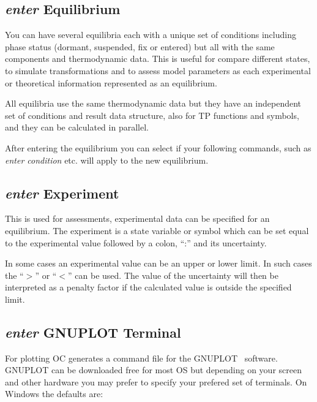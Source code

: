 \documentclass[11pt]{article}
\begin{document}
\hypertarget{Enter equilibrium}{}
\subsection{{\em enter} Equilibrium}

You can have several equilibria each with a unique set of conditions
including phase status (dormant, suspended, fix or entered) but all
with the same components and thermodynamic data.  This is useful for
compare different states, to simulate transformations and to assess
model parameters as each experimental or theoretical information
represented as an equilibrium.

All equilibria use the same thermodynamic data but they have an
independent set of conditions and result data structure, also for TP
functions and symbols, and they can be calculated in parallel.

After entering the equilibrium you can select if your following
commands, such as {\em enter condition} etc. will apply to the new
equilibrium.

\hypertarget{Enter experiment}{}
\subsection{{\em enter} Experiment}\label{sc:enterexp}

This is used for assessments, experimental data can be specified for
an equilibrium.  The experiment is a state variable or symbol which
can be set equal to the experimental value followed by a colon, ``:''
and its uncertainty.

In some cases an experimental value can be an upper or lower limit.
In such cases the ``$>$'' or ``$<$'' can be used.  The value of the
uncertainty will then be interpreted as a penalty factor if the
calculated value is outside the specified limit.

\hypertarget{Enter GNUTERM}{}
\subsection{{\em enter} GNUPLOT Terminal}\label{sc:gnuterm}

For plotting OC generates a command file for the
GNUPLOT~\cite{gnuplot} software.  GNUPLOT can be downloaded free for
most OS but depending on your screen and other hardware you may prefer
to specify your prefered set of terminals.  On Windows the defaults
are:
\end{document}
